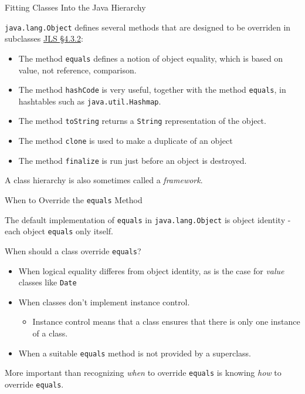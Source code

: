 \documentclass{beamer}
\begin{document}
\begin{frame}[fragile]{Fitting Classes Into the Java Hierarchy}


{\tt java.lang.Object} defines several methods that are designed to be overriden in subclasses \href{http://docs.oracle.com/javase/specs/jls/se7/html/jls-4.html#jls-4.3.2}{JLS \S 4.3.2}: 
\begin{itemize}
\item The method {\tt equals} defines a notion of object equality, which is based on value, not reference, comparison.
\item The method {\tt hashCode} is very useful, together with the method {\tt equals}, in hashtables such as {\tt java.util.Hashmap}.
\item The method {\tt toString} returns a {\tt String} representation of the object.
\item The method {\tt clone} is used to make a duplicate of an object
\item The method {\tt finalize} is run just before an object is destroyed.
\end{itemize}

A class hierarchy is also sometimes called a {\it framework}.

\end{frame}


\begin{frame}[fragile]{When to Override the {\tt equals} Method}


The default implementation of {\tt equals} in {\tt java.lang.Object} is object identity - each object {\tt equals} only itself.

When should a class override {\tt equals}?
\begin{itemize}
\item When logical equality differes from object identity, as is the case for {\it value} classes like {\tt Date}
\item When classes don't implement instance control.
  \begin{itemize}
  \item Instance control means that a class ensures that there is only one instance of a class.  
  \end{itemize}
\item When a suitable {\tt equals} method is not provided by a superclass.
\end{itemize}

More important than recognizing {\it when} to override {\tt equals} is knowing {\it how} to override {\tt equals}.
\end{frame}
\end{document}
